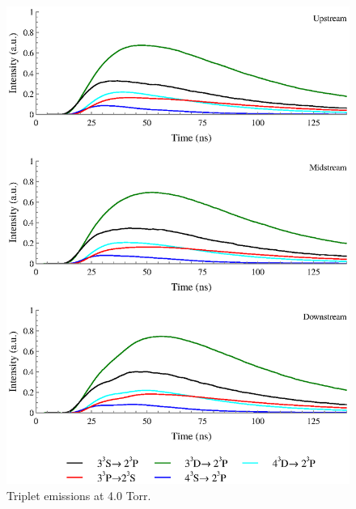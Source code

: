 \begin{figure}
  \centering
  \includegraphics{./chapters/extraem/figures/4torr_t.eps}
  \caption{Triplet emissions at 4.0 Torr.}
\end{figure}

